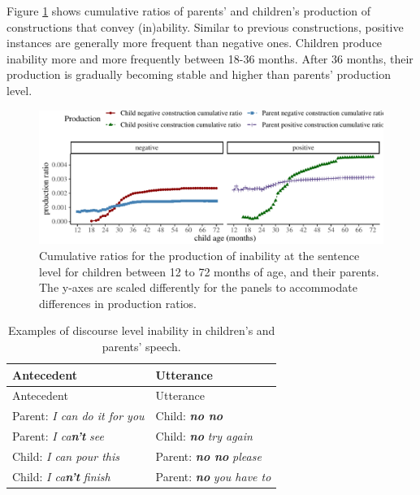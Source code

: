 \documentclass[
  man,floatsintext]{apa6}
\begin{document}
Figure \ref{fig:inability} shows cumulative ratios of parents' and children's production of constructions that convey (in)ability. Similar to previous constructions, positive instances are generally more frequent than negative ones. Children produce inability more and more frequently between 18-36 months. After 36 months, their production is gradually becoming stable and higher than parents' production level.

\begin{figure}[H]

{\centering \includegraphics{neg_construction_article_files/figure-latex/inability-1} 

}

\caption{Cumulative ratios for the production of inability at the sentence level for children between 12 to 72 months of age, and their parents. The y-axes are scaled differently for the panels to accommodate differences in production ratios.}\label{fig:inability}
\end{figure}

\begin{longtable}[]{@{}ll@{}}
\caption{\label{tab:disinability} Examples of discourse level inability in children's and parents' speech.}\tabularnewline
\toprule\noalign{}
Antecedent & Utterance \\
\midrule\noalign{}
\endfirsthead
\toprule\noalign{}
Antecedent & Utterance \\
\midrule\noalign{}
\endhead
\bottomrule\noalign{}
\endlastfoot
Parent: \emph{I can do it for you} & Child: \textbf{\emph{no no}} \\
Parent: \emph{I ca\textbf{n't}} \emph{see} & Child: \textbf{\emph{no}} \emph{try again} \\
Child: \emph{I can pour this} & Parent: \textbf{\emph{no no}} \emph{please} \\
Child: \emph{I ca\textbf{n't}} \emph{finish} & Parent: \textbf{\emph{no}} \emph{you have to} \\
\end{longtable}
\end{document}
